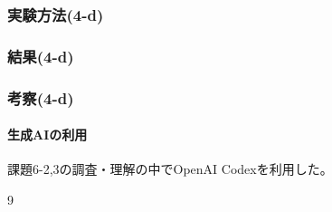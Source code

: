 \documentclass[a4j]{jarticle}
\begin{document}
\subsubsection{実験方法(4-d)}

\subsubsection{結果(4-d)}

\subsubsection{考察(4-d)}

\paragraph{生成AIの利用}
課題6-2,3の調査・理解の中でOpenAI Codexを利用した。

\begin{thebibliography}{9}

\end{thebibliography}
\end{document}
